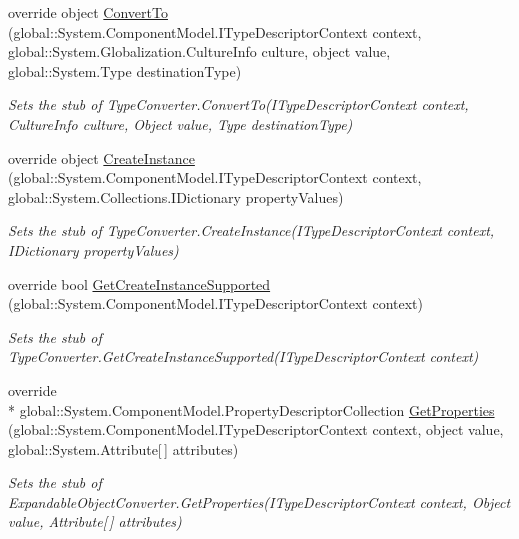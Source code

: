 \begin{DoxyCompactItemize}
override object \hyperlink{class_system_1_1_component_model_1_1_fakes_1_1_stub_expandable_object_converter_a03650148e6f492674d614c513d3da127}{Convert\-To} (global\-::\-System.\-Component\-Model.\-I\-Type\-Descriptor\-Context context, global\-::\-System.\-Globalization.\-Culture\-Info culture, object value, global\-::\-System.\-Type destination\-Type)
\begin{DoxyCompactList}\small\item\em Sets the stub of Type\-Converter.\-Convert\-To(\-I\-Type\-Descriptor\-Context context, Culture\-Info culture, Object value, Type destination\-Type)\end{DoxyCompactList}\item 
override object \hyperlink{class_system_1_1_component_model_1_1_fakes_1_1_stub_expandable_object_converter_a35699764972acccf56215e0d199c69ee}{Create\-Instance} (global\-::\-System.\-Component\-Model.\-I\-Type\-Descriptor\-Context context, global\-::\-System.\-Collections.\-I\-Dictionary property\-Values)
\begin{DoxyCompactList}\small\item\em Sets the stub of Type\-Converter.\-Create\-Instance(\-I\-Type\-Descriptor\-Context context, I\-Dictionary property\-Values)\end{DoxyCompactList}\item 
override bool \hyperlink{class_system_1_1_component_model_1_1_fakes_1_1_stub_expandable_object_converter_a8863fc671e77a291ccab1ac0ebd78205}{Get\-Create\-Instance\-Supported} (global\-::\-System.\-Component\-Model.\-I\-Type\-Descriptor\-Context context)
\begin{DoxyCompactList}\small\item\em Sets the stub of Type\-Converter.\-Get\-Create\-Instance\-Supported(\-I\-Type\-Descriptor\-Context context)\end{DoxyCompactList}\item 
override \\*
global\-::\-System.\-Component\-Model.\-Property\-Descriptor\-Collection \hyperlink{class_system_1_1_component_model_1_1_fakes_1_1_stub_expandable_object_converter_aed34c80e30144016a14e943378b801a1}{Get\-Properties} (global\-::\-System.\-Component\-Model.\-I\-Type\-Descriptor\-Context context, object value, global\-::\-System.\-Attribute\mbox{[}$\,$\mbox{]} attributes)
\begin{DoxyCompactList}\small\item\em Sets the stub of Expandable\-Object\-Converter.\-Get\-Properties(\-I\-Type\-Descriptor\-Context context, Object value, Attribute\mbox{[}$\,$\mbox{]} attributes)\end{DoxyCompactList}\item 

\end{DoxyCompactItemize}
